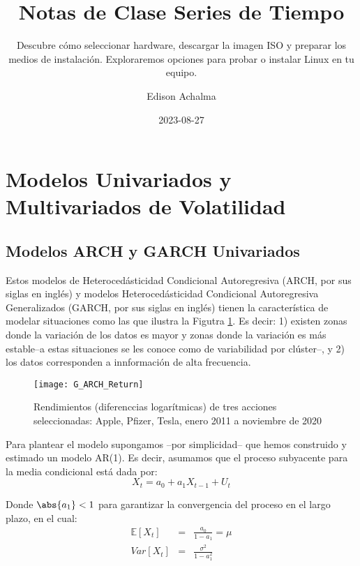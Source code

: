 \documentclass[
  a4paper,
]{article}
\title{Notas de Clase Series de Tiempo}
\subtitle{Descubre cómo seleccionar hardware, descargar la imagen ISO y
preparar los medios de instalación. Exploraremos opciones para probar o
instalar Linux en tu equipo.}
\author{Edison Achalma}
\date{2023-08-27}
\begin{document}
\maketitle
\ifdefined\Shaded\renewenvironment{Shaded}{\begin{tcolorbox}[frame hidden, interior hidden, boxrule=0pt, borderline west={3pt}{0pt}{shadecolor}, sharp corners, breakable, enhanced]}{\end{tcolorbox}}\fi

\hypertarget{modelos-univariados-y-multivariados-de-volatilidad}{%
\section{Modelos Univariados y Multivariados de
Volatilidad}\label{modelos-univariados-y-multivariados-de-volatilidad}}

\hypertarget{modelos-arch-y-garch-univariados}{%
\subsection{Modelos ARCH y GARCH
Univariados}\label{modelos-arch-y-garch-univariados}}

Estos modelos de Heterocedásticidad Condicional Autoregresiva (ARCH, por
sus siglas en inglés) y modelos Heterocedásticidad Condicional
Autoregresiva Generalizados (GARCH, por sus siglas en inglés) tienen la
característica de modelar situaciones como las que ilustra la Figutra
\ref{G_ARCH_Return}. Es decir: 1) existen zonas donde la variación de
los datos es mayor y zonas donde la variación es más estable--a estas
situaciones se les conoce como de variabilidad por clúster--, y 2) los
datos corresponden a innformación de alta frecuencia.

\begin{figure}
  \centering
    \texttt{[image: G\_ARCH\_Return]}
  \caption{ Rendimientos (diferenccias logarítmicas) de tres acciones seleccionadas: Apple, Pfizer, Tesla, enero 2011 a noviembre de 2020}
  \label{G_ARCH_Return}
\end{figure}

Para plantear el modelo supongamos --por simplicidad-- que hemos
construido y estimado un modelo AR(1). Es decir, asumamos que el proceso
subyacente para la media condicional está dada por: \[
    X_t = a_0 + a_1 X_{t-1} + U_t
\]

Donde \(\abs{a_1} < 1\) para garantizar la convergencia del proceso en
el largo plazo, en el cual: \begin{eqnarray*}
    \mathbb{E}[X_t] & = & \frac{a_0 }{1 - a_1} = \mu \\
    Var[X_t] & = & \frac{\sigma^2}{1 - a_1^2}
\end{eqnarray*}
\end{document}
